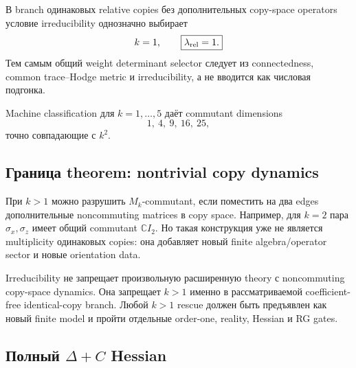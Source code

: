 \begin{theorem}
В branch одинаковых relative copies без дополнительных copy-space operators
условие irreducibility однозначно выбирает
\begin{equation}
 k=1,
 \qquad
 \boxed{\lambda_{\rm rel}=1.}
\end{equation}
Тем самым общий weight determinant selector следует из connectedness,
common trace--Hodge metric и irreducibility, а не вводится как числовая
подгонка.
\end{theorem}

Machine classification для \(k=1,\ldots,5\) даёт commutant dimensions
\begin{equation}
 1,\ 4,\ 9,\ 16,\ 25,
\end{equation}
точно совпадающие с \(k^2\).

\subsection{Граница theorem: nontrivial copy dynamics}

При \(k>1\) можно разрушить \(M_k\)-commutant, если поместить на два edges
дополнительные noncommuting matrices в copy space. Например, для \(k=2\)
пара \(\sigma_x,\sigma_z\) имеет общий commutant \(\mathbb C I_2\). Но такая
конструкция уже не является multiplicity одинаковых copies: она добавляет
новый finite algebra/operator sector и новые orientation data.

\begin{nogocriterion}
Irreducibility не запрещает произвольную расширенную theory с noncommuting
copy-space dynamics. Она запрещает \(k>1\) именно в рассматриваемой
coefficient-free identical-copy branch. Любой \(k>1\) rescue должен быть
предъявлен как новый finite model и пройти отдельные order-one, reality,
Hessian и RG gates.
\end{nogocriterion}

\subsection{Полный \texorpdfstring{\(\Delta+C\)}{Delta+C} Hessian}

